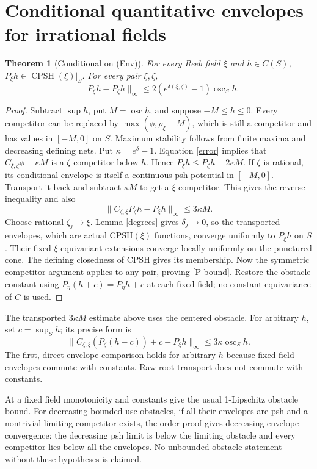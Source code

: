 \documentclass[11pt]{article}
\newtheorem{theorem}{Theorem}
\newcommand{\CPSH}{\operatorname{CPSH}}
\newcommand{\osc}{\operatorname{osc}}
\begin{document}
\section{Conditional quantitative envelopes for irrational fields}
\begin{theorem}[Conditional on (Env)]\label{envelopes}
For every Reeb field $\xi$ and $h\in C(S)$, $P_\xi h\in\CPSH(\xi)|_S$.
For every pair $\xi,\zeta$,
\begin{equation}\label{P-bound}
 \|P_\xi h-P_\zeta h\|_\infty\leq
 2(e^{\delta(\xi,\zeta)}-1)\osc_S h.
\end{equation}
\end{theorem}
\begin{proof}
Subtract $\sup h$, put $M=\osc h$, and suppose $-M\leq h\leq0$.
Every competitor can be replaced by $\max(\phi,\rho_\xi-M)$, which is still a competitor and has values in $[-M,0]$ on $S$.
Maximum stability follows from finite maxima and decreasing defining nets.
Put $\kappa=e^\delta-1$.
Equation \eqref{error} implies that $C_{\xi,\zeta}\phi-\kappa M$ is a $\zeta$ competitor below $h$.
Hence $P_\xi h\leq P_\zeta h+2\kappa M$.
If $\zeta$ is rational, its conditional envelope is itself a continuous psh potential in $[-M,0]$.
Transport it back and subtract $\kappa M$ to get a $\xi$ competitor.
This gives the reverse inequality and also
\[
 \|C_{\zeta,\xi}P_\zeta h-P_\xi h\|_\infty\leq3\kappa M.
\]
Choose rational $\zeta_j\to\xi$.
Lemma \ref{degrees} gives $\delta_j\to0$, so the transported envelopes, which are actual CPSH$(\xi)$ functions, converge uniformly to $P_\xi h$ on $S$.
Their fixed-$\xi$ equivariant extensions converge locally uniformly on the punctured cone.
The defining closedness of CPSH gives its membership.
Now the symmetric competitor argument applies to any pair, proving \eqref{P-bound}.
Restore the obstacle constant using $P_\eta(h+c)=P_\eta h+c$ at each fixed field; no constant-equivariance of $C$ is used.
\end{proof}
The transported $3\kappa M$ estimate above uses the centered obstacle.
For arbitrary $h$, set $c=\sup_S h$; its precise form is
\[
 \|C_{\zeta,\xi}(P_\zeta(h-c))+c-P_\xi h\|_\infty
 \leq 3\kappa\osc_S h.
\]
The first, direct envelope comparison holds for arbitrary $h$ because fixed-field
envelopes commute with constants. Raw root transport does not commute with constants.

At a fixed field monotonicity and constants give the usual 1-Lipschitz obstacle bound.
For decreasing bounded usc obstacles, if all their envelopes are psh and a nontrivial limiting competitor exists, the order proof gives decreasing envelope convergence: the decreasing psh limit is below the limiting obstacle and every competitor lies below all the envelopes.
No unbounded obstacle statement without these hypotheses is claimed.
\end{document}
